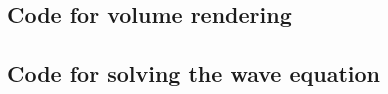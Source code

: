 \documentclass[a4paper]{article}
\begin{document}
\subsection{Code for volume rendering}


\subsection{Code for solving the wave equation}

\end{document}
